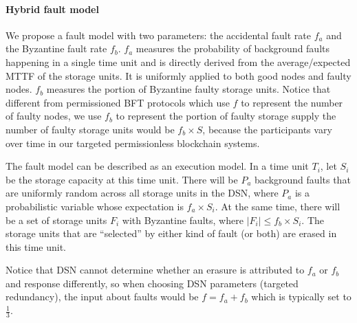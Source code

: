 
\paragraph{Hybrid fault model}
We propose a fault model with two parameters: the accidental fault rate $f_a$ and the Byzantine fault rate $f_b$.
$f_a$ measures the probability of background faults happening in a single time unit and is directly derived from the average/expected MTTF of the storage units.
It is uniformly applied to both good nodes and faulty nodes.
$f_b$ measures the portion of Byzantine faulty storage units.
Notice that different from permissioned BFT protocols which use $f$ to represent the number of faulty nodes, we use $f_b$ to represent the portion of faulty storage supply \ie the number of faulty storage units would be $f_b \times S$, because the participants vary over time in our targeted permissionless blockchain systems.

The fault model can be described as an execution model.
In a time unit $T_i$, let $S_i$ be the storage capacity at this time unit.
There will be $P_a$ background faults that are uniformly random across all storage units in the DSN, where $P_a$ is a probabilistic variable whose expectation is $f_a\times S_i$.
At the same time, there will be a set of storage units $F_i$ with Byzantine faults, where $|F_i|\leq f_b\times S_i$.
The storage units that are ``selected'' by either kind of fault (or both) are erased in this time unit.



Notice that DSN cannot determine whether an erasure is attributed to $f_a$ or $f_b$ and response differently, so when choosing DSN parameters (\eg targeted redundancy), the input about faults would be $f=f_a+f_b$ which is typically set to $\frac{1}{3}$.

